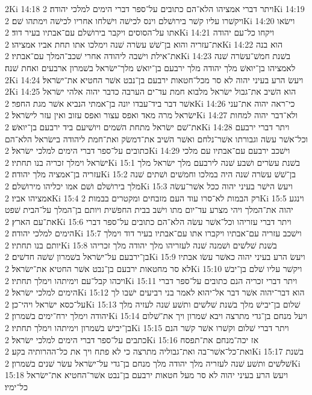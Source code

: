 2Ki 14:18  ויתר דברי אמציהו הלא־הם כתובים על־ספר דברי הימים למלכי יהודה׃
2Ki 14:19  ויקשׁרו עליו קשׁר בירושׁלם וינס לכישׁה וישׁלחו אחריו לכישׁה וימתהו שׁם׃
2Ki 14:20  וישׂאו אתו על־הסוסים ויקבר בירושׁלם עם־אבתיו בעיר דוד׃
2Ki 14:21  ויקחו כל־עם יהודה את־עזריה והוא בן־שׁשׁ עשׂרה שׁנה וימלכו אתו תחת אביו אמציהו׃
2Ki 14:22  הוא בנה את־אילת וישׁבה ליהודה אחרי שׁכב־המלך עם־אבתיו׃
2Ki 14:23  בשׁנת חמשׁ־עשׂרה שׁנה לאמציהו בן־יואשׁ מלך יהודה מלך ירבעם בן־יואשׁ מלך־ישׂראל בשׁמרון ארבעים ואחת שׁנה׃
2Ki 14:24  ויעשׂ הרע בעיני יהוה לא סר מכל־חטאות ירבעם בן־נבט אשׁר החטיא את־ישׂראל׃
2Ki 14:25  הוא השׁיב את־גבול ישׂראל מלבוא חמת עד־ים הערבה כדבר יהוה אלהי ישׂראל אשׁר דבר ביד־עבדו יונה בן־אמתי הנביא אשׁר מגת החפר׃
2Ki 14:26  כי־ראה יהוה את־עני ישׂראל מרה מאד ואפס עצור ואפס עזוב ואין עזר לישׂראל׃
2Ki 14:27  ולא־דבר יהוה למחות את־שׁם ישׂראל מתחת השׁמים ויושׁיעם ביד ירבעם בן־יואשׁ׃
2Ki 14:28  ויתר דברי ירבעם וכל־אשׁר עשׂה וגבורתו אשׁר־נלחם ואשׁר השׁיב את־דמשׂק ואת־חמת ליהודה בישׂראל הלא־הם כתובים על־ספר דברי הימים למלכי ישׂראל׃
2Ki 14:29  וישׁכב ירבעם עם־אבתיו עם מלכי ישׂראל וימלך זכריה בנו תחתיו׃
2Ki 15:1  בשׁנת עשׂרים ושׁבע שׁנה לירבעם מלך ישׂראל מלך עזריה בן־אמציה מלך יהודה׃
2Ki 15:2  בן־שׁשׁ עשׂרה שׁנה היה במלכו וחמשׁים ושׁתים שׁנה מלך בירושׁלם ושׁם אמו יכליהו מירושׁלם׃
2Ki 15:3  ויעשׂ הישׁר בעיני יהוה ככל אשׁר־עשׂה אמציהו אביו׃
2Ki 15:4  רק הבמות לא־סרו עוד העם מזבחים ומקטרים בבמות׃
2Ki 15:5  וינגע יהוה את־המלך ויהי מצרע עד־יום מתו וישׁב בבית החפשׁית ויותם בן־המלך על־הבית שׁפט את־עם הארץ׃
2Ki 15:6  ויתר דברי עזריהו וכל־אשׁר עשׂה הלא־הם כתובים על־ספר דברי הימים למלכי יהודה׃
2Ki 15:7  וישׁכב עזריה עם־אבתיו ויקברו אתו עם־אבתיו בעיר דוד וימלך יותם בנו תחתיו׃
2Ki 15:8  בשׁנת שׁלשׁים ושׁמנה שׁנה לעזריהו מלך יהודה מלך זכריהו בן־ירבעם על־ישׂראל בשׁמרון שׁשׁה חדשׁים׃
2Ki 15:9  ויעשׂ הרע בעיני יהוה כאשׁר עשׂו אבתיו לא סר מחטאות ירבעם בן־נבט אשׁר החטיא את־ישׂראל׃
2Ki 15:10  ויקשׁר עליו שׁלם בן־יבשׁ ויכהו קבל־עם וימיתהו וימלך תחתיו׃
2Ki 15:11  ויתר דברי זכריה הנם כתובים על־ספר דברי הימים למלכי ישׂראל׃
2Ki 15:12  הוא דבר־יהוה אשׁר דבר אל־יהוא לאמר בני רביעים ישׁבו לך על־כסא ישׂראל ויהי־כן׃
2Ki 15:13  שׁלום בן־יבישׁ מלך בשׁנת שׁלשׁים ותשׁע שׁנה לעזיה מלך יהודה וימלך ירח־ימים בשׁמרון׃
2Ki 15:14  ויעל מנחם בן־גדי מתרצה ויבא שׁמרון ויך את־שׁלום בן־יבישׁ בשׁמרון וימיתהו וימלך תחתיו׃
2Ki 15:15  ויתר דברי שׁלום וקשׁרו אשׁר קשׁר הנם כתבים על־ספר דברי הימים למלכי ישׂראל׃
2Ki 15:16  אז יכה־מנחם את־תפסח ואת־כל־אשׁר־בה ואת־גבוליה מתרצה כי לא פתח ויך את כל־ההרותיה בקע׃
2Ki 15:17  בשׁנת שׁלשׁים ותשׁע שׁנה לעזריה מלך יהודה מלך מנחם בן־גדי על־ישׂראל עשׂר שׁנים בשׁמרון׃
2Ki 15:18  ויעשׂ הרע בעיני יהוה לא סר מעל חטאות ירבעם בן־נבט אשׁר־החטיא את־ישׂראל כל־ימיו׃
